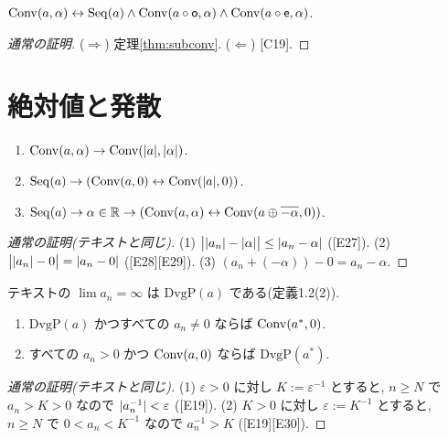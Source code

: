 \begin{prop}[テキスト命題2.13]
  $\mathrm{Conv}(a, \alpha) \leftrightarrow \mathrm{Seq}(a) \land \mathrm{Conv}(a \circ \mathsf{o}, \alpha) \land \mathrm{Conv}(a \circ \mathsf{e}, \alpha)$.
\end{prop}
\begin{proof}[通常の証明]
  ($\Rightarrow$) 定理\ref{thm:subconv}. ($\Leftarrow$) [C19].
\end{proof}

\section{絶対値と発散}

\begin{lem}\end{lem}

\begin{thm}[テキスト定理2.15]
  \begin{enumerate}[label=(\arabic*)]
    \item $\mathrm{Conv}(a, \alpha) \to \mathrm{Conv}(\lvert a\rvert, \lvert \alpha\rvert)$.
    \item $\mathrm{Seq}(a) \to (\mathrm{Conv}(a, 0) \leftrightarrow \mathrm{Conv}(\lvert a\rvert, 0))$.
    \item $\mathrm{Seq}(a) \to \alpha \in \mathbb{R} \to (\mathrm{Conv}(a, \alpha) \leftrightarrow \mathrm{Conv}(a \oplus \overline{-\alpha}, 0))$.
  \end{enumerate}
\end{thm}
\begin{proof}[通常の証明(テキストと同じ)]
  (1) $\bigl\lvert\lvert a_n\rvert - \lvert \alpha\rvert\bigr\rvert \leq \lvert a_n - \alpha\rvert$ ([E27]). (2) $\bigl\lvert \lvert a_n\rvert - 0 \bigr\rvert = \lvert a_n - 0\rvert$ ([E28][E29]). (3) $(a_n + (-\alpha)) - 0 = a_n - \alpha$.
\end{proof}

テキストの $\lim a_n = \infty$ は $\mathrm{DvgP}(a)$ である(定義1.2(2)).

\begin{thm}[テキスト定理2.16, 2.17]
  \begin{enumerate}[label=(\arabic*)]
    \item $\mathrm{DvgP}(a)$ かつすべての $a_n \neq 0$ ならば $\mathrm{Conv}(a^{\ast}, 0)$.
    \item すべての $a_n > 0$ かつ $\mathrm{Conv}(a, 0)$ ならば $\mathrm{DvgP}(a^{\ast})$.
  \end{enumerate}
\end{thm}
\begin{proof}[通常の証明(テキストと同じ)]
  (1) $\varepsilon > 0$ に対し $K := \varepsilon^{-1}$ とすると, $n \geq N$ で $a_n > K > 0$ なので $\lvert a_n^{-1}\rvert < \varepsilon$ ([E19]). (2) $K > 0$ に対し $\varepsilon := K^{-1}$ とすると, $n \geq N$ で $0 < a_n < K^{-1}$ なので $a_n^{-1} > K$ ([E19][E30]).
\end{proof}

